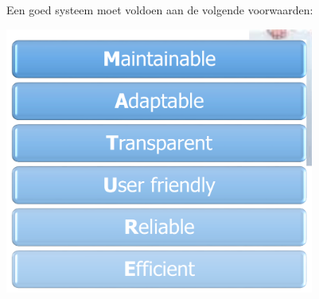 Een goed systeem moet voldoen aan de volgende voorwaarden:

\begin{center}
\includegraphics[width=4in]{img/requirementsforgoodsystem}%
\label{labelname}%
\end{center}

